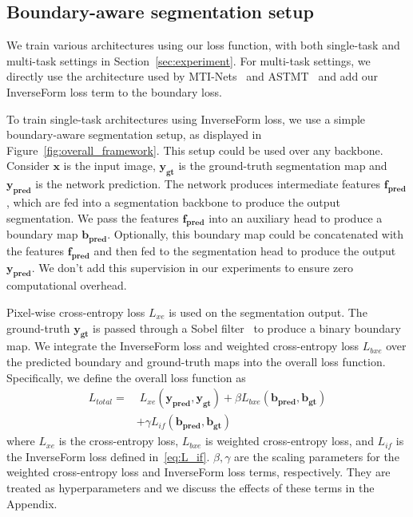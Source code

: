 \documentclass[final]{cvpr}
\begin{document}
\subsection{Boundary-aware segmentation setup}\label{sec:bd_aware_seg}

We train various architectures using our loss function, with both single-task and multi-task settings in Section~\ref{sec:experiment}. For multi-task settings, we directly use the architecture used by MTI-Nets~\cite{vandenhende2020mti} and ASTMT~\cite{maninis2019attentive} and add our InverseForm loss term to the boundary loss.
 
To train single-task architectures using InverseForm loss, we use a simple boundary-aware segmentation setup, as displayed in Figure~\ref{fig:overall_framework}. This setup could be used over any backbone. Consider \(\boldsymbol{x}\) is the input image, \(\boldsymbol{y_{gt}}\) is the ground-truth segmentation map and \(\boldsymbol{y_{pred}}\) is the network prediction. The network produces intermediate features \(\boldsymbol{f_{pred}}\), which are fed into a segmentation backbone to produce the output segmentation. We pass the features \(\boldsymbol{f_{pred}}\) into an auxiliary head to produce a boundary map \(\boldsymbol{b_{pred}}\). Optionally, this boundary map could be concatenated with the features \(\boldsymbol{f_{pred}}\) and then fed to the segmentation head to produce the output \(\boldsymbol{y_{pred}}\). We don't add this supervision in our experiments to ensure zero computational overhead.

Pixel-wise cross-entropy loss \(L_{xe}\) is used on the segmentation output. The ground-truth \(\boldsymbol{y_{gt}}\) is passed through a Sobel filter~\cite{canny1986computational} to produce a binary boundary map. We integrate the InverseForm loss and weighted cross-entropy loss \(L_{bxe}\) over the predicted boundary and ground-truth maps into the overall loss function. Specifically, we define the overall loss function as  
\begin{align}\label{equ:L_total}
L_{total} = & \; L_{xe}(\boldsymbol{y_{pred}}, \boldsymbol{y_{gt}}) + \beta L_{bxe}(\boldsymbol{b_{pred}}, \boldsymbol{b_{gt}}) \nonumber\\
&+ \gamma L_{if}(\boldsymbol{b_{pred}}, \boldsymbol{b_{gt}})
\end{align}
where $L_{xe}$ is the cross-entropy loss, $L_{bxe}$ is weighted cross-entropy loss, and $L_{if}$ is the InverseForm loss defined in~\eqref{eq:L_if}. \(\beta, \gamma\) are the scaling parameters for the weighted cross-entropy loss and InverseForm loss terms, respectively. They are treated as hyperparameters and we discuss the effects of these terms in the Appendix. 
\end{document}
